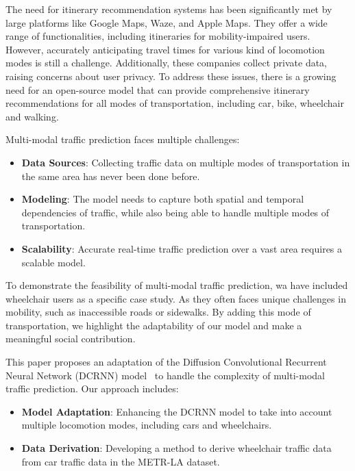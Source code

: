 The need for itinerary recommendation systems has been significantly met by large platforms like Google Maps, Waze, and Apple Maps.
They offer a wide range of functionalities, including itineraries for mobility-impaired users.
However, accurately anticipating travel times for various kind of locomotion modes is still a challenge.
Additionally, these companies collect private data, raising concerns about user privacy.
To address these issues, there is a growing need for an open-source model that can provide comprehensive itinerary
    recommendations for all modes of transportation, including car, bike, wheelchair and walking.

Multi-modal traffic prediction faces multiple challenges:
\begin{itemize}
    \item \textbf{Data Sources}: Collecting traffic data on multiple modes of transportation in the same area has never been done before.
    \item \textbf{Modeling}: The model needs to capture both spatial and temporal dependencies of traffic,
       while also being able to handle multiple modes of transportation.
    \item \textbf{Scalability}: Accurate real-time traffic prediction over a vast area requires a scalable model.
\end{itemize}

To demonstrate the feasibility of multi-modal traffic prediction, wa have included wheelchair users as a specific case study.
As they often faces unique challenges in mobility, such as inaccessible roads or sidewalks.
By adding this mode of transportation, we highlight the adaptability of our model and make a meaningful social contribution.

This paper proposes an adaptation of the Diffusion Convolutional Recurrent Neural Network (DCRNN) model~\cite{DCRNN} to handle the complexity of multi-modal traffic prediction.
Our approach includes:
\begin{itemize}
    \item \textbf{Model Adaptation}: Enhancing the DCRNN model to take into account multiple locomotion modes, including cars and wheelchairs.
    \item \textbf{Data Derivation}: Developing a method to derive wheelchair traffic data from car traffic data in the METR-LA dataset.
\end{itemize}
